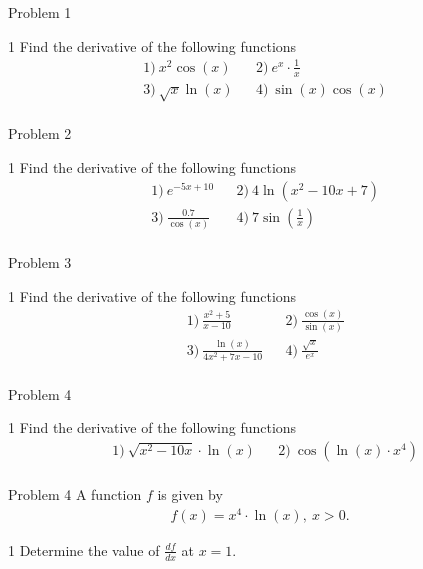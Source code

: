 \begin{opgavetekst}{Problem 1}
\end{opgavetekst}
\begin{delopgave}{1}
	Find the derivative of the following functions
	\begin{align*}
		&1) \   x^2\cos(x)   &&2) \  e^x\cdot\frac{1}{x}     \\
		&3) \ \sqrt{x}\ln(x) &&4) \ \sin(x)\cos(x)  \\
	\end{align*}
\end{delopgave}

\begin{opgavetekst}{Problem 2}
\end{opgavetekst}
\begin{delopgave}{1}
	Find the derivative of the following functions
	\begin{align*}
		&1) \  e^{-5x+10}   &&2) \  4\ln(x^2-10x+7)     \\
		&3) \ \frac{0.7}{\cos(x)} &&4) \ 7\sin\left(\frac{1}{x}\right)  \\
	\end{align*}
\end{delopgave}

\begin{opgavetekst}{Problem 3}
\end{opgavetekst}
\begin{delopgave}{1}
	Find the derivative of the following functions
	\begin{align*}
		&1) \  \frac{x^2+5}{x-10}   &&2) \  \frac{\cos(x)}{\sin(x)}     \\
		&3) \ \frac{\ln(x)}{4x^2 + 7x - 10} &&4) \ \frac{\sqrt{x}}{e^x}  \\
	\end{align*}
\end{delopgave}


\begin{opgavetekst}{Problem 4}
\end{opgavetekst}
\begin{delopgave}{1}
	Find the derivative of the following functions
	\begin{align*}
		&1) \  \sqrt{x^2-10x}\cdot\ln(x)   &&2) \  \cos\left(\ln(x)\cdot x^4\right)   \\
	\end{align*}
\end{delopgave}

\begin{opgavetekst}{Problem 4}	
	A function $f$ is given by
	\begin{align*}
		f(x) = x^4\cdot\ln(x), \ x> 0.
	\end{align*}
\end{opgavetekst}
\begin{delopgave}{1}
	Determine the value of $\frac{df}{dx}$ at $x = 1$.
\end{delopgave}


